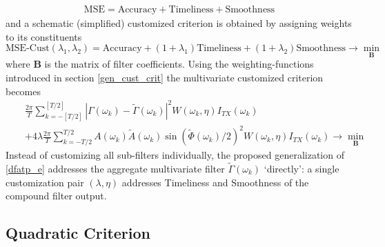 \documentclass[a4paper]{book}
\begin{document}
\begin{eqnarray*}
\textrm{MSE}=\textrm{Accuracy}+ \textrm{Timeliness}+ \textrm{Smoothness}
\end{eqnarray*}
and a schematic (simplified) customized criterion is obtained by assigning weights to its constituents
\begin{equation}\label{ats_cust_e}
\textrm{MSE-Cust}(\lambda_1,\lambda_2)=\textrm{Accuracy}+(1+\lambda_1) \textrm{Timeliness}+(1+\lambda_2) \textrm{Smoothness}\to \min_{\mathbf{B}}
\end{equation}
where $\mathbf{B}$ is the matrix of filter coefficients. Using the weighting-functions introduced in section \ref{gen_cust_crit} the multivariate customized criterion becomes
\begin{eqnarray}
&&\frac{2\pi}{T} \sum_{k=-[T/2]}^{[T/2]}
|\Gamma(\omega_k)-\tilde{\Gamma}(\omega_k)|^2 W(\omega_k,\eta)I_{TX}(\omega_k)\nonumber\\
&&+4\lambda\frac{2\pi}{ T} \sum_{k=-T/2}^{T/2}
A(\omega_k)\tilde{A}(\omega_k)\sin(\tilde{\Phi}(\omega_k)/2)^2
W(\omega_k,\eta)I_{TX}(\omega_k)\to\min_{\mathbf{B}}\label{dfatp_i}
\end{eqnarray}
Instead of customizing all sub-filters individually, the proposed generalization of \ref{dfatp_e} addresses the aggregate multivariate filter  $\tilde{\Gamma}(\omega_k)$  `directly': a single customization pair $(\lambda,\eta)$ addresses Timeliness and Smoothness of the compound filter output.  






\subsection{Quadratic Criterion}
\end{document}
